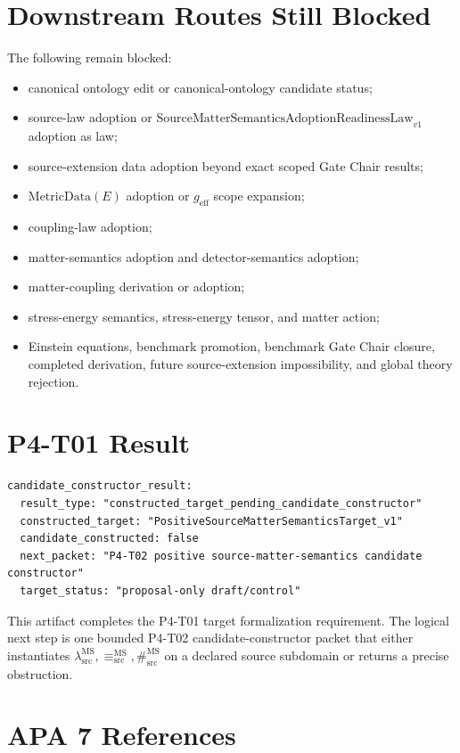\documentclass[11pt]{article}
\newcommand{\SMSAR}{\mathrm{SourceMatterSemanticsAdoptionReadinessLaw}_{v1}}
\newcommand{\lambdaSrc}{\lambda^{\mathrm{MS}}_{\mathrm{src}}}
\newcommand{\EqMS}{\equiv^{\mathrm{MS}}_{\mathrm{src}}}
\newcommand{\SepMS}{\#^{\mathrm{MS}}_{\mathrm{src}}}
\newcommand{\MetricData}{\mathrm{MetricData}}
\newcommand{\geff}{g_{\mathrm{eff}}}
\begin{document}
\section{Downstream Routes Still Blocked}

The following remain blocked:
\begin{itemize}[leftmargin=*]
  \item canonical ontology edit or canonical-ontology candidate status;
  \item source-law adoption or \(\SMSAR\) adoption as law;
  \item source-extension data adoption beyond exact scoped Gate Chair results;
  \item \(\MetricData(E)\) adoption or \(\geff\) scope expansion;
  \item coupling-law adoption;
  \item matter-semantics adoption and detector-semantics adoption;
  \item matter-coupling derivation or adoption;
  \item stress-energy semantics, stress-energy tensor, and matter action;
  \item Einstein equations, benchmark promotion, benchmark Gate Chair closure,
  completed derivation, future source-extension impossibility, and global
  theory rejection.
\end{itemize}

\section{P4-T01 Result}

\begin{verbatim}
candidate_constructor_result:
  result_type: "constructed_target_pending_candidate_constructor"
  constructed_target: "PositiveSourceMatterSemanticsTarget_v1"
  candidate_constructed: false
  next_packet: "P4-T02 positive source-matter-semantics candidate constructor"
  target_status: "proposal-only draft/control"
\end{verbatim}

This artifact completes the P4-T01 target formalization requirement. The
logical next step is one bounded P4-T02 candidate-constructor packet that
either instantiates \(\lambdaSrc,\EqMS,\SepMS\) on a declared source subdomain
or returns a precise obstruction.

\section{APA 7 References}
\end{document}
